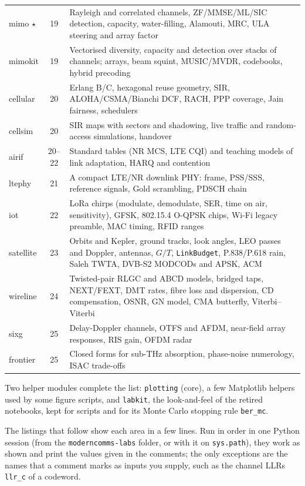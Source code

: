 \begin{table}[htbp]
\begin{tabularx}{\linewidth}{@{}>{\ttfamily}lc>{\raggedright\arraybackslash}X@{}}
mimo $\star$ & 19 & Rayleigh and correlated channels, ZF/MMSE/ML/SIC detection, capacity, water-filling, Alamouti, MRC, ULA steering and array factor\\
mimokit & 19 & Vectorised diversity, capacity and detection over stacks of channels; arrays, beam squint, MUSIC/MVDR, codebooks, hybrid precoding\\
cellular & 20 & Erlang B/C, hexagonal reuse geometry, SIR, ALOHA/CSMA/Bianchi DCF, RACH, PPP coverage, Jain fairness, schedulers\\
cellsim & 20 & SIR maps with sectors and shadowing, live traffic and random-access simulations, handover\\
airif & 20--22 & Standard tables (NR MCS, LTE CQI) and teaching models of link adaptation, HARQ and contention\\
ltephy & 21 & A compact LTE/NR downlink PHY: frame, PSS/SSS, reference signals, Gold scrambling, PDSCH chain\\
iot & 22 & LoRa chirps (modulate, demodulate, SER, time on air, sensitivity), GFSK, 802.15.4 O-QPSK chips, Wi-Fi legacy preamble, MAC timing, RFID ranges\\
satellite & 23 & Orbits and Kepler, ground tracks, look angles, LEO passes and Doppler, antennas, $G/T$, \texttt{LinkBudget}, P.838/P.618 rain, Saleh TWTA, DVB-S2 MODCODs and APSK, ACM\\
wireline & 24 & Twisted-pair RLGC and ABCD models, bridged taps, NEXT/FEXT, DMT rates, fibre loss and dispersion, CD compensation, OSNR, GN model, CMA butterfly, Viterbi--Viterbi\\
sixg & 25 & Delay-Doppler channels, OTFS and AFDM, near-field array responses, RIS gain, OFDM radar\\
frontier & 25 & Closed forms for sub-THz absorption, phase-noise numerology, ISAC trade-offs\\
\bottomrule
\end{tabularx}
\end{table}

Two helper modules complete the list: \texttt{plotting} (core), a few Matplotlib helpers used by
some figure scripts, and \texttt{labkit}, the look-and-feel of the retired notebooks, kept for
scripts and for its Monte Carlo stopping rule \texttt{ber\_mc}.

The listings that follow show each area in a few lines. Run in order in one Python session (from
the \texttt{moderncomms-labs} folder, or with it on \texttt{sys.path}), they work as shown and print
the values given in the comments; the only exceptions are the names that a comment marks as inputs
you supply, such as the channel LLRs \texttt{llr\_c} of a codeword.


